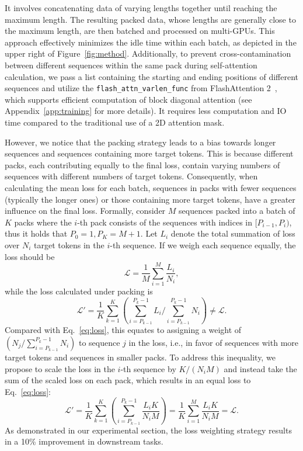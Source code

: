  It involves concatenating data of varying lengths together until reaching the maximum length.
The resulting packed data, whose lengths are generally close to the maximum length, are then batched and processed on multi-GPUs.
This approach effectively minimizes the idle time within each batch, as depicted in the upper right of Figure~\ref{fig:method}.
Additionally, to prevent cross-contamination between different sequences within the same pack during self-attention calculation, we pass a list containing the starting and ending positions of different sequences and utilize the \texttt{flash\_attn\_varlen\_func} from FlashAttention 2~\cite{dao2022flashattention,dao2023flashattention2}, which supports efficient computation of block diagonal attention (see Appendix~\ref{app:training} for more details).
It requires less computation and IO time compared to the traditional use of a 2D attention mask.

However, we notice that the packing strategy leads to a bias towards longer sequences and sequences containing more target tokens.
This is because different packs, each contributing equally to the final loss, contain varying numbers of sequences with different numbers of target tokens. Consequently, when calculating the mean loss for each batch, sequences in packs with fewer sequences (typically the longer ones) or those containing more target tokens, have a greater influence on the final loss.
Formally, consider $M$ sequences packed into a batch of $K$ packs where the $i$-th pack consists of the sequences with indices in $[P_{i-1}, P_i)$, thus it holds that $P_0=1, P_K=M+1$. Let $L_i$ denote the total summation of loss over $N_i$ target tokens in the $i$-th sequence. If we weigh each sequence equally, the loss should be
\begin{equation}
    \mathcal{L} = \frac{1}{M}\sum_{i=1}^{M}\frac{L_i}{N_i},
\label{eq:loss}
\end{equation}
while the loss calculated under packing is 
\begin{equation}
    \mathcal{L}' = \frac{1}{K}\sum_{k=1}^{K}(\sum_{i=P_{k-1}}^{P_{k}-1}L_i / \sum_{i=P_{k-1}}^{P_{k}-1}N_i) \neq \mathcal{L}.
\label{eq:loss'}
\end{equation}
Compared with Eq.~\ref{eq:loss}, this equates to assigning a weight of $(N_j/\sum_{i=P_{k-1}}^{P_{k}-1}N_i)$ to sequence $j$ in the loss, i.e., in favor of sequences with more target tokens and sequences in smaller packs.
To address this inequality, we propose to scale the loss in the $i$-th sequence by $K/(N_iM)$ and instead take the sum of the scaled loss on each pack, which results in an equal loss to Eq.~\ref{eq:loss}:
\begin{equation}
    \mathcal{L}' = \frac{1}{K}\sum_{k=1}^{K}(\sum_{i=P_{k-1}}^{P_{k}-1}\frac{L_iK}{N_iM})
    = \frac{1}{K}\sum_{i=1}^{M}\frac{L_iK}{N_iM}=\mathcal{L}.
\end{equation}
As demonstrated in our experimental section, the loss weighting strategy results in a 10\% improvement in downstream tasks.

